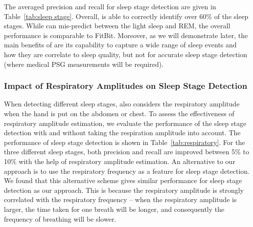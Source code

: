 The averaged precision and recall for sleep stage detection are given in Table~\ref{tab:sleep stage}. Overall, \systemname is able to
correctly identify over 60\% of the sleep stages. While {\systemname} can mis-predict between the light sleep and REM, the overall
performance is comparable to FitBit. Moreover, as we will demonstrate later, the main benefits of {\systemname} are its capability to
capture a wide range of sleep events and how they are correlate to sleep quality, but not for accurate sleep stage detection (where medical
PSG measurements will be required).



\subsubsection{Impact of Respiratory Amplitudes on Sleep Stage Detection}

When detecting different sleep stages, \systemname also considers the respiratory amplitude when the hand is put on the abdomen or chest.
To assess the effectiveness of respiratory amplitude estimation, we evaluate the performance of the sleep stage detection with and without
taking the respiration amplitude into account. The performance of sleep stage detection is shown in Table~\ref{tab:respiratory}. For the
three different sleep stages, both precision and recall are improved between 5\% to 10\% with the help of respiratory amplitude estimation.
An alternative to our approach is to use the respiratory frequency  as a feature for sleep stage detection. We found that this alternative
scheme gives similar performance for sleep stage detection as our approach. This is because the respiratory amplitude is strongly
correlated with the respiratory frequency -- when the respiratory amplitude is larger, the time taken for one breath will be longer, and
consequently the frequency of breathing will be slower.

